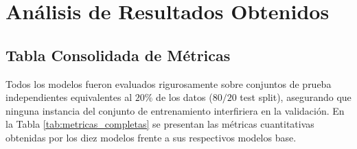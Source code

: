 \documentclass[12pt,letterpaper]{article}
\begin{document}
\section{Análisis de Resultados Obtenidos}

\subsection{Tabla Consolidada de Métricas}
Todos los modelos fueron evaluados rigurosamente sobre conjuntos de prueba independientes equivalentes al $20\%$ de los datos ($80/20$ test split), asegurando que ninguna instancia del conjunto de entrenamiento interfiriera en la validación. En la Tabla \ref{tab:metricas_completas} se presentan las métricas cuantitativas obtenidas por los diez modelos frente a sus respectivos modelos base.
\end{document}
